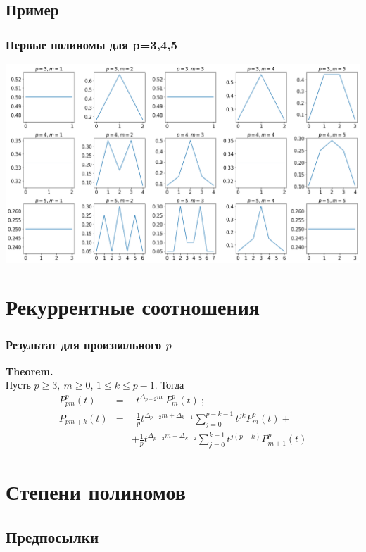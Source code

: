 \subsection{Пример}
\begin{frame}
\frametitle{Первые полиномы для p=3,4,5}
\includegraphics[width=\linewidth]{distributions_with_labels}
\end{frame}


\section{Рекуррентные соотношения}

\begin{frame}
    \frametitle{Результат для произвольного $p$}
     {\bf Theorem.}\\ \bigskip
     Пусть $p \ge 3,\ m \ge 0$, $1 \le k \le p-1$. Тогда
     \bigskip 
     \begin{eqnarray*} 
     P_{pm}^p(t) & = &  ~~t^{\Delta_{p-2} m}\ P_m^p(t)\ ; \\
     P_{pm+k}(t) & = &  ~~\frac{1}{p} t^{\Delta_{p-2} m + \Delta_{k-1}}\sum\limits_{j=0}^{p-k-1} t^{jk} P_m^p(t) + \\
     & & + \frac{1}{p} t^{\Delta_{p-2} m + \Delta_{k-2}}\sum\limits_{j=0}^{k-1} t^{j(p-k)} P_{m+1}^p(t) 
      \end{eqnarray*}
\end{frame}


\section{Степени полиномов}
\subsection{Предпосылки}

